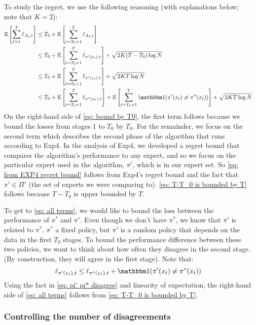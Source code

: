 \documentclass[11pt]{article}
\begin{document}
To study the regret, we use the following reasoning (with explanations below; note that $K=2$):
\begin{align}
\E{\sum_{t=1}^T\ell_{A_t,t}} &\le T_0 +\E{\sum_{t=T_0+1}^T\ell_{A_t,t}}\label{eq: bound by T0}\\
& \le T_0 + \E{\sum_{t=T_0+1}^T\ell_{\pi'(x_t),t}}+ \sqrt{2K(T-T_0) \log{N}} \label{eq: from EXP4 regret bound}\\
& \le T_0 + \E{\sum_{t=T_0+1}^T\ell_{\pi'(x_t),t}}+  \sqrt{2KT\log{N}}\label{eq: T-T_0 is bounded by T}\\
&\le T_0 + \E{\sum_{t=T_0+1}^T \ell_{\pi^*{(x_t)},t}} + \E{\sum_{t=T_0+1}^T{\ind(\pi'(x_t)\neq \pi^*(x_t))}} + \sqrt{2KT\log{N}}
\label{eq: all terms}
\end{align}
On the right-hand side of \eqref{eq: bound by T0}, the first term follows because we bound the losses from stages $1$ to $T_0$ by $T_0$. For the remainder, we focus on the second term which describes the second phase of the algorithm that runs according to Exp4. In the analysis of Exp4, we developed a regret bound that compares the algorithm's performance to any expert, and so we focus on the particular expert used in the algorithm, $\pi'$, which is in our expert set. So \eqref{eq: from EXP4 regret bound} follows from Exp4's regret bound and the fact that $\pi' \in \Pi'$ (the set of experts we were comparing to). \eqref{eq: T-T_0 is bounded by T} follows because $T-T_0$ is upper bounded by $T$. 

To get to \eqref{eq: all terms}, we would like to bound the loss between the performance of $\pi^*$ and $\pi'$. Even though we don't have $\pi^*$, we know that $\pi'$ is related to $\pi^*$. $\pi^*$ a fixed policy, but $\pi'$ is a random policy that depends on the data in the first $T_0$ stages. To bound the performance difference between these two policies, we want to think about how often they disagree in the second stage. (By construction, they will agree in the first stage). Note that:
\begin{equation}
\ell_{\pi'(x_t),t}\le \ell_{\pi^*(x_t),t} + \ind(\pi'(x_t)\neq \pi^*(x_t))\label{eq: pi' pi* disagree}
\end{equation}
Using the fact in \eqref{eq: pi' pi* disagree} and linearity of expectation, the right-hand side of \eqref{eq: all terms} follows from \eqref{eq: T-T_0 is bounded by T}. 

\subsubsection{Controlling the number of disagreements}
\end{document}
